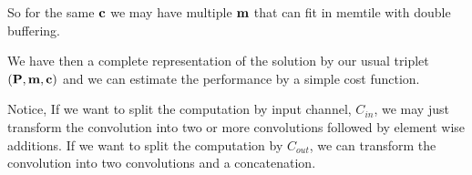 \documentclass[journal]{IEEEtran}
\begin{document}
So for the same ${\bf c}$ we may have
multiple ${\bf m}$ that can fit in memtile with double buffering.

We have then a complete representation of the solution by our usual
triplet $({\bf P, m ,c})$ and we can estimate the performance by a
simple cost function. 

Notice, If we want to split the computation by input channel,
$C_{in}$, we may just transform the convolution into two or more
convolutions followed by element wise additions. If we want to split
the computation by $C_{out}$, we can transform the convolution into
two convolutions and a concatenation.

























 

%
\end{document}
